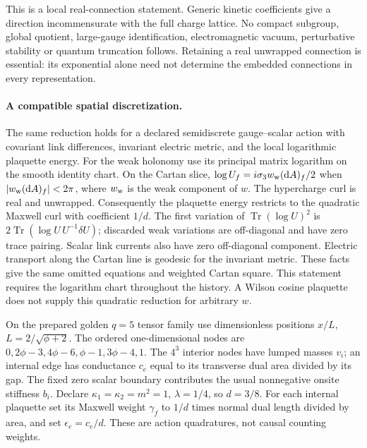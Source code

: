 This is a local real-connection statement. Generic kinetic coefficients
give a direction incommensurate with the full charge lattice. No compact
subgroup, global quotient, large-gauge identification, electromagnetic
vacuum, perturbative stability or quantum truncation follows. Retaining a
real unwrapped connection is essential: its exponential alone need not
determine the embedded connections in every representation.

\paragraph{A compatible spatial discretization.}
The same reduction holds for a declared semidiscrete gauge--scalar action
with covariant link differences, invariant electric metric, and the local
logarithmic plaquette energy. For the weak holonomy use its principal
matrix logarithm on the smooth identity chart. On the Cartan slice,
$\log U_f=i\sigma_3 w_{\rm w}(\mathrm dA)_f/2$ when
$|w_{\rm w}(\mathrm dA)_f|<2\pi$, where $w_{\rm w}$ is the weak component of $w$.
The hypercharge curl is real and unwrapped. Consequently the plaquette
energy restricts to the quadratic Maxwell curl with coefficient $1/d$.
The first variation of $\operatorname{Tr}(\log U)^2$ is
$2\operatorname{Tr}(\log U\,U^{-1}\delta U)$; discarded weak variations
are off-diagonal and have zero trace pairing. Scalar link currents also
have zero off-diagonal component. Electric transport along the Cartan line
is geodesic for the invariant metric. These facts give the same omitted
equations and weighted Cartan square. This statement requires the logarithm
chart throughout the history. A Wilson cosine plaquette does not supply
this quadratic reduction for arbitrary $w$.

On the prepared golden $q=5$ tensor family use dimensionless positions
$x/L$, $L=2/\sqrt{\phi+2}$. The ordered one-dimensional nodes are
$0,2\phi-3,4\phi-6,\phi-1,3\phi-4,1$. The $4^3$ interior nodes have
lumped masses $v_i$; an internal edge has conductance $c_e$ equal to its
transverse dual area divided by its gap. The fixed zero scalar boundary
contributes the usual nonnegative onsite stiffness $b_i$. Declare
$\kappa_1=\kappa_2=m^2=1$, $\lambda=1/4$, so $d=3/8$.
For each internal plaquette set its Maxwell weight $\gamma_f$ to $1/d$
times normal dual length divided by area, and set $\epsilon_e=c_e/d$.
These are action quadratures, not causal counting weights.

